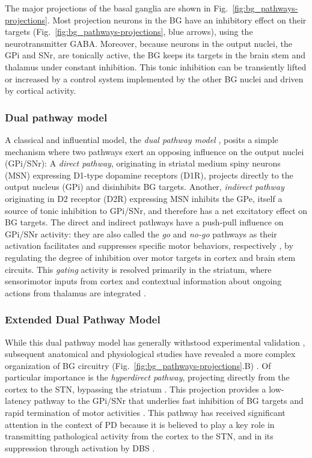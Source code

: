 The major projections of the basal ganglia are shown in Fig.~\ref{fig:bg_pathways-projections}.
Most projection neurons in the BG have an inhibitory effect on their targets
(Fig.~\ref{fig:bg_pathways-projections}, blue arrows), using the neurotransmitter GABA.
Moreover, because neurons in the output nuclei, the GPi and SNr, are tonically active,
the BG keeps its targets in the brain stem and thalamus under constant inhibition.
This tonic inhibition can be transiently lifted or increased by a control system
implemented by the other BG nuclei and driven by cortical activity.
%
%

\subsubsection*{Dual pathway model}
A classical and influential model, the \textit{dual pathway model} \cite{albin_functional_1989},
posits a simple mechanism where two pathways exert an opposing influence
on the output nuclei (GPi/SNr):
%
A \textit{direct pathway}, originating in striatal medium spiny neurons (MSN)
expressing D1-type dopamine receptors (D1R), projects directly to the output nucleus
(GPi) and disinhibits BG targets. Another, \textit{indirect pathway} originating in
D2 receptor (D2R) expressing MSN inhibits the GPe, itself a source of tonic inhibition
to GPi/SNr, and therefore has a net excitatory effect on BG targets.
The direct and indirect pathways have a push-pull influence on GPi/SNr activity:
they are also called the \textit{go} and \textit{no-go} pathways as their activation
facilitates and suppresses specific motor behaviors, respectively \cite{kravitz_regulation_2010},
by regulating the degree of inhibition over motor targets in cortex and brain stem circuits.
This \textit{gating} activity is resolved primarily in the striatum, where
sensorimotor inputs from cortex and contextual information about ongoing actions
from thalamus are integrated \cite{jin_shaping_2015,jahanshahi_frontostriatosubthalamicpallidal_2015}.

\subsubsection*{Extended Dual Pathway Model}
While this dual pathway model has generally withstood experimental validation
\cite{calabresi_direct_2014,friend_working_2014}, subsequent anatomical and physiological studies have
revealed a more complex organization of BG circuitry (Fig.~\ref{fig:bg_pathways-projections}.B) \cite{mallet_dichotomous_2012,nambu_functional_2002,calabresi_direct_2014}.
%
Of particular importance is the \textit{hyperdirect pathway}, projecting directly from
the cortex to the STN, bypassing the striatum \cite{nambu_dual_1996}. This projection provides a low-latency
pathway to the GPi/SNr that underlies fast inhibition of BG targets and rapid termination
of motor activities \cite{nambu_functional_2002}. This pathway has received significant
attention in the context of PD because it is believed to play a key role in transmitting
pathological activity from the cortex to the STN, and in its suppression through activation by DBS
\cite{mackinnon_stimulation_2005,li_resonant_2007,gradinaru_optical_2009,li_therapeutic_2012}.
%
%

